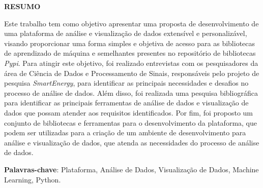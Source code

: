 



\renewenvironment{resumo}{\vspace{15pt}
    \normalsize
    {\normalfont\bfseries\Large\textbf{RESUMO}}
    \vspace{15pt}
}{\endquotation}

\renewenvironment{abstract}{\vspace{15pt}
    \normalsize\centering
    {\normalfont\bfseries\Large\textbf{ABSTRACT}}
    \vspace{15pt}
}{\endquotation}

\begin{resumo}
	\noindent

    \justifying

    Este trabalho tem como objetivo apresentar uma proposta de desenvolvimento de uma plataforma de análise e visualização de dados extensível e personalizável, visando proporcionar uma forma simples e objetiva de acesso para as bibliotecas de aprendizado de máquina e semelhantes presentes no repositório de bibliotecas \textit{Pypi}. Para atingir este objetivo, foi realizado entrevistas com os pesquisadores da área de Ciência de Dados e Processamento de Sinais, responsáveis pelo projeto de pesquisa \textit{SmartEnergy}, para identificar as principais necessidades e desafios no processo de análise de dados. Além disso, foi realizada uma pesquisa bibliográfica para identificar as principais ferramentas de análise de dados e visualização de dados que possam atender aos requisitos identificados. Por fim, foi proposto um conjunto de bibliotecas e ferramentas para o desenvolvimento da plataforma, que podem ser utilizadas para a criação de um ambiente de desenvolvimento para análise e visualização de dados, que atenda as necessidades do processo de análise de dados.

    \textbf{Palavras-chave}: Plataforma, Análise de Dados, Visualização de Dados, Machine Learning, Python.
\end{resumo}

\newpage



